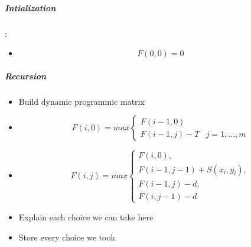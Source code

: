 \subparagraph{Intialization}:
	\begin{itemize}
		\item \[F(0,0) = 0\]
	\end{itemize}

\subparagraph{Recursion}
	\begin{itemize}
		\item Build dynamic programmic matrix
		\item  \[F(i,0) = max \left\{ \begin{array}{lr}F(i-1,0)&\\F(i-1,j)-T& j=1,\dots,m\end{array}\right. \]
		\item  \[F(i,j) = max \left\{ \begin{array}{lr}F(i,0),\\F(i-1,j-1)+S(x_i,y_i),\\F(i-1,j)-d,\\F(i,j-1)-d\end{array}\right.\]
		\item Explain each choice we can take here
		\item Store every choice we took
	\end{itemize}

